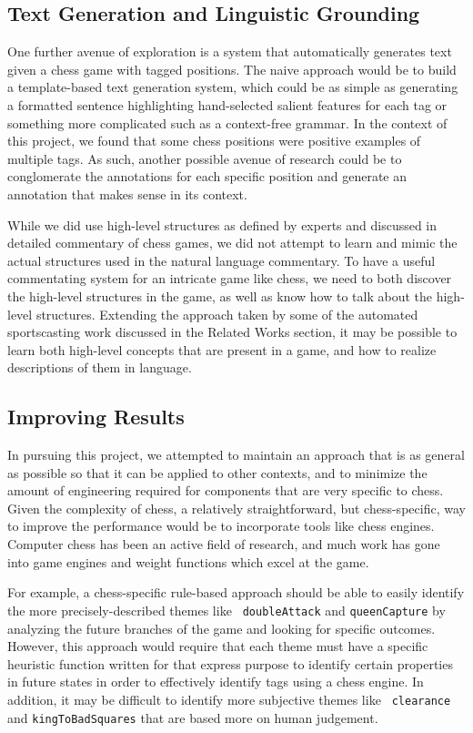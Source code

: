 \documentclass[11pt]{article}
\begin{document}
\subsection{Text Generation and Linguistic Grounding}
One further avenue of exploration is a system that automatically 
generates text given a chess game with tagged positions. The naive 
approach would be to build a template-based text generation system, 
which could be as simple as generating a formatted sentence highlighting 
hand-selected salient features for each tag or something more 
complicated such as a context-free grammar. In the context of this 
project, we found that some chess positions were positive examples of 
multiple tags. As such, another possible avenue of research could be to 
conglomerate the annotations for each specific position and generate an 
annotation that makes sense in its context.

While we did use high-level structures as defined by experts and 
discussed in detailed commentary of chess games, we did not attempt to 
learn and mimic the actual structures used in the natural language 
commentary. To have a useful commentating system for an intricate game 
like chess, we need to both discover the high-level structures in the 
game, as well as know how to talk about the high-level structures. 
Extending the approach taken by some of the automated sportscasting work 
discussed in the Related Works section, it may be possible to learn both 
high-level concepts that are present in a game, and how to realize 
descriptions of them in language.

\subsection{Improving Results}
In pursuing this project, we attempted to maintain an approach that is 
as general as possible so that it can be applied to other contexts, and 
to minimize the amount of engineering required for components that are 
very specific to chess. Given the complexity of chess, a relatively 
straightforward, but chess-specific, way to improve the performance 
would be to incorporate tools like chess engines. Computer chess has 
been an active field of research, and much work has gone into game 
engines and weight functions which excel at the game. 

For example, a chess-specific rule-based approach should be able to 
easily identify the more precisely-described themes like {\tt 
doubleAttack} and {\tt queenCapture} by analyzing the future branches of 
the game and looking for specific outcomes. However, this approach would 
require that each theme must have a specific heuristic function written 
for that express purpose to identify certain properties in future states 
in order to effectively identify tags using a chess engine. In addition, 
it may be difficult to identify more subjective themes like {\tt 
clearance} and {\tt kingToBadSquares} that are based more on human 
judgement.
\end{document}
